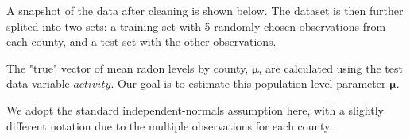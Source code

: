 \documentclass{article}
\begin{document}




A snapshot of the data after cleaning is shown below.
The dataset is then further splited into two sets:
a training set with 5 randomly chosen observations from
each county, and a test set with the other observations.

The "true" vector of mean radon levels by county, $\bm{\mu}$, are calculated
using the test data variable $activity$. Our goal is to estimate this
population-level parameter $\bm{\mu}$.


We adopt the standard independent-normals assumption here, with a slightly
different notation due to the multiple observations for each county.
\end{document}
